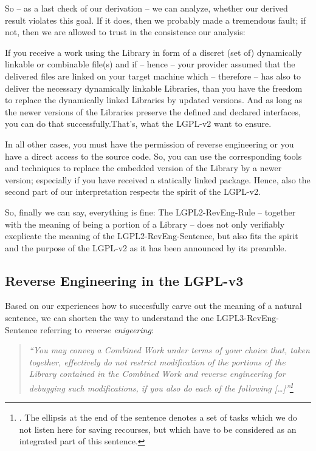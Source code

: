 So -- as a last check of our derivation -- we can analyze, whether our derived
result violates this goal. If it does, then we probably made a tremendous fault;
if not, then we are allowed to trust in the consistence our analysis:

If you receive a work using the Library in form of a discret (set of)
dynamically linkable or combinable file(s) and if -- hence -- your provider
assumed that the delivered files are linked on your target machine which --
therefore -- has also to deliver the necessary dynamically linkable Libraries,
than you have the freedom to replace the dynamically linked Libraries by updated
versions. And as long as the newer versions of the Libraries preserve the
defined and declared interfaces, you can do that successfully.That's, what the 
LGPL-v2 want to ensure.

In all other cases, you must have the permission of reverse engineering or you
have a direct access to the source code. So, you can use the corresponding tools
and techniques to replace the embedded version of the Library by a newer
version; especially if you have received a statically linked package. Hence,
also the second part of our interpretation respects the spirit of the LGPL-v2.

So, finally we can say, everything is fine: The LGPL2-RevEng-Rule -- together
with the meaning of being a portion of a Library -- does not only verifiably
exeplicate the meaning of the LGPL2-RevEng-Sentence, but also fits the spirit
and the purpose of the LGPL-v2 as it has been announced by its preamble.

\subsection{Reverse Engineering in the LGPL-v3}

Based on our experiences how to succesfully carve out the meaning of a natural
sentence, we can shorten the way to understand the one LGPL3-RevEng-Sentence
referring to \emph{reverse enigeering}:

\begin{quote}\emph{ \enquote{You may convey a Combined Work under terms of your
choice that, taken together, effectively do not restrict modification of the
portions of the Library contained in the Combined Work and reverse engineering
for debugging such modifications, if you also do each of the following
[\ldots]}\footnote{\cite[cf.][\nopage wp., §4]{Lgpl30OsiLicense2007a}. The
ellipsis at the end of the sentence denotes a set of tasks which we do not
listen here for saving recourses, but which have to be considered as an
integrated part of this sentence.}}
\end{quote}

